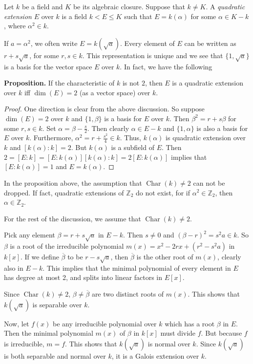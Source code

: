 \documentclass[12pt]{article}
\begin{document}
Let $k$ be a field and $K$ be its algebraic closure.  Suppose that $k\neq K$.  A \emph{quadratic extension} $E$ over $k$ is a field $k< E\leq K$ such that $E=k(\alpha)$ for some $\alpha\in K-k$, where $\alpha^2\in k$.

If $a=\alpha^2$, we often write $E=k(\sqrt{a})$.  Every element of $E$ can be written as $r+s\sqrt{a}$, for some $r,s\in k$.  This representation is unique and we see that $\lbrace 1,\sqrt{a}\rbrace$ is a basis for the vector space $E$ over $k$.  In fact, we have the following

\textbf{Proposition.}  If the characteristic of $k$ is not $2$, then $E$ is a quadratic extension over $k$ iff $\operatorname{dim}(E)=2$ (as a vector space) over $k$.
\begin{proof}  One direction is clear from the above discussion.  So suppose $\operatorname{dim}(E)=2$ over $k$ and $\lbrace 1,\beta \rbrace$ is a basis for $E$ over $k$.  Then $\beta^2=r+s\beta$ for some $r,s\in k$.  Set $\alpha=\beta-\frac{s}{2}$.  Then clearly $\alpha\in E-k$ and $\lbrace 1,\alpha\rbrace$ is also a basis for $E$ over $k$.  Furthermore,  $\alpha^2= r+\frac{s^2}{4}\in k$.  Thus, $k(\alpha)$ is quadratic extension over $k$ and $[k(\alpha):k]=2$.  But $k(\alpha)$ is a subfield of $E$.  Then $2=[E:k]= [E:k(\alpha)][k(\alpha):k]=2[E:k(\alpha)]$ implies that $[E:k(\alpha)]=1$ and $E=k(\alpha)$.
\end{proof}

In the proposition above, the assumption that $\operatorname{Char}(k)\ne 2$ can not be dropped.  If fact, quadratic extensions of $\mathbb{Z}_2$ do not exist, for if $\alpha^2\in \mathbb{Z}_2$, then $\alpha\in \mathbb{Z}_2$.

For the rest of the discussion, we assume that $\operatorname{Char}(k)\ne 2$.

Pick any element $\beta=r+s\sqrt{a}$ in $E-k$.  Then $s\neq 0$ and $(\beta - r)^2=s^2a\in k$.  So $\beta$ is a root of the irreducible polynomial $m(x)=x^2-2rx+(r^2-s^2a)$ in $k[x]$.  If we define $\overline{\beta}$ to be $r-s\sqrt{a}$, then $\overline{\beta}$ is the other root of $m(x)$, clearly also in $E-k$.  This implies that the minimal polynomial of every element in $E$ has degree at most 2, and splits into linear factors in $E[x]$.  

Since $\operatorname{Char}(k)\ne 2$, $\beta\neq\overline{\beta}$ are two distinct roots of $m(x)$.  This shows that $k(\sqrt{a})$ is separable over $k$.

Now, let $f(x)$ be any irreducible polynomial over $k$ which has a root $\beta$ in $E$.  Then the minimal polynomial $m(x)$ of $\beta$ in $k[x]$ must divide $f$.  But because $f$ is irreducible, $m=f$.  This shows that $k(\sqrt{a})$ is normal over $k$.  Since $k(\sqrt{a})$ is both separable and normal over $k$, it is a Galois extension over $k$.
\end{document}
